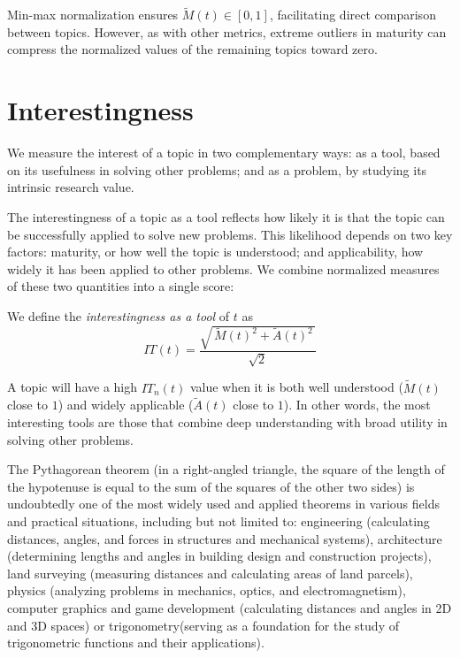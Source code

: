 Min-max normalization ensures $\tilde{M}(t) \in [0,1]$, facilitating direct comparison between topics. However, as with other metrics, extreme outliers in maturity can compress the normalized values of the remaining topics toward zero.

%
%

\section{Interestingness}
\label{sec:interestingness-metrics}

We measure the interest of a topic in two complementary ways: as a tool, based on its usefulness in solving other problems; and as a problem, by studying its intrinsic research value.

The interestingness of a topic as a tool reflects how likely it is that the topic can be successfully applied to solve new problems. This likelihood depends on two key factors: maturity, or how well the topic is understood; and applicability, how widely it has been applied to other problems. We combine normalized measures of these two quantities into a single score:

\begin{definition}
We define the \emph{interestingness as a tool} of $t$ as
\[
IT(t)=\frac{\sqrt{\,\tilde{M}(t)^2+\tilde{A}(t)^2\,}}{\sqrt{2}}
\]
\end{definition}

A topic will have a high $IT_n(t)$ value when it is both well understood ($\tilde{M}(t)$ close to $1$) and widely applicable ($\tilde{A}(t)$ close to $1$). In other words, the most interesting tools are those that combine deep understanding with broad utility in solving other problems.

\begin{example}
The Pythagorean theorem (in a right-angled triangle, the square of the length of the hypotenuse is equal to the sum of the squares of the other two sides) is undoubtedly one of the most widely used and applied theorems in various fields and practical situations, including but not limited to: engineering (calculating distances, angles, and forces in structures and mechanical systems), architecture (determining lengths and angles in building design and construction projects), land surveying (measuring distances and calculating areas of land parcels), physics (analyzing problems in mechanics, optics, and electromagnetism), computer graphics and game development (calculating distances and angles in 2D and 3D spaces) or trigonometry(serving as a foundation for the study of trigonometric functions and their applications).
\end{example}

